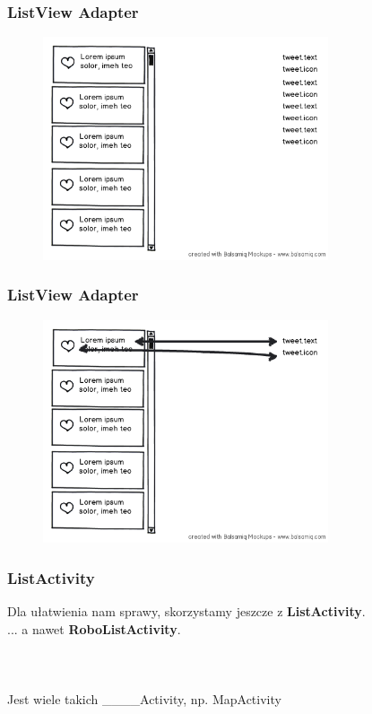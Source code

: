 \documentclass{beamer}
\begin{document}
\begin{frame}\frametitle{ListView Adapter}
\begin{figure}
 \centering
 \includegraphics[width=0.75\textwidth]{images/adapter_1}
\end{figure}
\end{frame}

\begin{frame}\frametitle{ListView Adapter}
\begin{figure}
 \centering
 \includegraphics[width=0.75\textwidth]{images/adapter_2}
\end{figure}
\end{frame}

\begin{frame}\frametitle{ListActivity}
\begin{center}
 Dla ułatwienia nam sprawy, skorzystamy jeszcze z \textbf{ListActivity}.\\
 \pause ... a nawet \textbf{RoboListActivity}.\\
\ \\
\ \\
\ \\
\small{Jest wiele takich \_\_\_\_Activity, np. MapActivity }
\end{center}
\end{frame}
\end{document}
